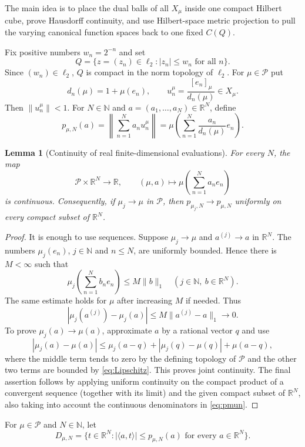 \documentclass[11pt]{article}
\newtheorem{lemma}[theorem]{Lemma}
\theoremstyle{definition}
\newcommand{\Pcal}{\mathcal P}
\newcommand{\N}{\mathbb N}
\newcommand{\R}{\mathbb R}
\newcommand{\ellTwo}{\ell_2}
\begin{document}
The main idea is to place the dual balls of all $X_\mu$ inside one compact
Hilbert cube, prove Hausdorff continuity, and use Hilbert-space metric projection
to pull the varying canonical function spaces back to one fixed $C(Q)$.

Fix positive numbers $w_n=2^{-n}$ and set
\[
 Q=\{z=(z_n)\in\ellTwo: |z_n|\leq w_n\text{ for all }n\}.
 \tag{4.1}\label{eq:Q}
\]
Since $(w_n)\in\ellTwo$, $Q$ is compact in the norm topology of $\ellTwo$.
For $\mu\in\Pcal$ put
\[
 d_n(\mu)=1+\mu(e_n),\qquad
 u_n^\mu=\frac{[e_n]_\mu}{d_n(\mu)}\in X_\mu.
 \tag{4.2}\label{eq:normalized}
\]
Then $\|u_n^\mu\|<1$.  For $N\in\N$ and $a=(a_1,\ldots,a_N)\in\R^N$, define
\[
 p_{\mu,N}(a)
 =\left\|\sum_{n=1}^N a_nu_n^\mu\right\|
 =\mu\left(\sum_{n=1}^N\frac{a_n}{d_n(\mu)}e_n\right).
 \tag{4.3}\label{eq:pmun}
\]

\begin{lemma}[Continuity of real finite-dimensional evaluations]
\label{lem:finite-eval}
For every $N$, the map
\[
 \Pcal\times\R^N\longrightarrow\R,
 \qquad
 (\mu,a)\longmapsto\mu\left(\sum_{n=1}^N a_ne_n\right)
\]
is continuous.  Consequently, if $\mu_j\to\mu$ in $\Pcal$, then
$p_{\mu_j,N}\to p_{\mu,N}$ uniformly on every compact subset of $\R^N$.
\end{lemma}

\begin{proof}
It is enough to use sequences.  Suppose $\mu_j\to\mu$ and $a^{(j)}\to a$ in
$\R^N$.  The numbers $\mu_j(e_n)$, $j\in\N$ and $n\leq N$, are uniformly
bounded.  Hence there is $M<\infty$ such that
\[
 \mu_j\left(\sum_{n=1}^N b_ne_n\right)\leq M\|b\|_1
 \quad(j\in\N,\ b\in\R^N).
 \tag{4.4}\label{eq:Lipschitz}
\]
The same estimate holds for $\mu$ after increasing $M$ if needed.  Thus
\[
 |\mu_j(a^{(j)})-\mu_j(a)|\leq M\|a^{(j)}-a\|_1\longrightarrow0.
\]
To prove $\mu_j(a)\to\mu(a)$, approximate $a$ by a rational vector $q$ and use
\[
 |\mu_j(a)-\mu(a)|
 \leq \mu_j(a-q)+|\mu_j(q)-\mu(q)|+\mu(a-q),
\]
where the middle term tends to zero by the defining topology of $\Pcal$ and the
other two terms are bounded by \eqref{eq:Lipschitz}.  This proves joint
continuity.  The final assertion follows by applying uniform continuity on the
compact product of a convergent sequence (together with its limit) and the given
compact subset of $\R^N$, also taking into account the continuous denominators
in \eqref{eq:pmun}.
\end{proof}

For $\mu\in\Pcal$ and $N\in\N$, let
\[
 D_{\mu,N}=
 \{t\in\R^N: |\langle a,t\rangle|\leq p_{\mu,N}(a)
                 \text{ for every }a\in\R^N\}.
 \tag{4.5}\label{eq:Dmun}
\]
\end{document}
